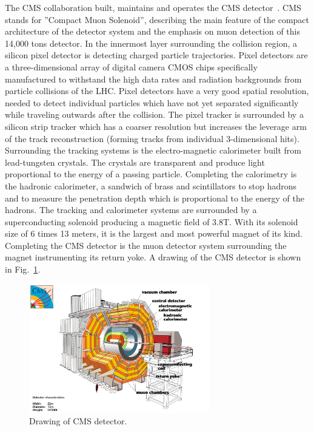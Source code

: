 \documentclass{wscpaperproc}
\theoremstyle{wsc}
\begin{document}
The CMS collaboration built, maintains and operates the CMS detector~. CMS stands for ''Compact Muon Solenoid'', describing the main feature of the compact architecture of the detector system and the emphasis on muon detection of this 14,000 tons detector. In the innermost layer surrounding the collision region, a silicon pixel detector is detecting charged particle trajectories. Pixel detectors are a three-dimensional array of digital camera CMOS chips specifically manufactured to withstand the high data rates and radiation backgrounds from particle collisions of the LHC. Pixel detectors have a very good spatial resolution, needed to detect individual particles which have not yet separated significantly while traveling outwards after the collision. The pixel tracker is surrounded by a silicon strip tracker which has a coarser resolution but increases the leverage arm of the track reconstruction (forming tracks from individual 3-dimensional hits). Surrounding the tracking systems is the electro-magnetic calorimeter built from lead-tungsten crystals. The crystals are transparent and produce light proportional to the energy of a passing particle. Completing the calorimetry is the hadronic calorimeter, a sandwich of brass and scintillators to stop hadrons and to measure the penetration depth which is proportional to the energy of the hadrons. The tracking and calorimeter systems are surrounded by a superconducting solenoid producing a magnetic field of 3.8T. With its solenoid size of 6 times 13 meters, it is the largest and most powerful magnet of its kind. Completing the CMS detector is the muon detector system surrounding the magnet instrumenting its return yoke. A drawing of the CMS detector is shown in Fig.~\ref{fig:cms}.

\begin{figure}[htb]
{
   \centering
   \includegraphics[width=0.70\textwidth]{cms}
   \caption{Drawing of CMS detector.
   \label{fig:cms}}
}
\end{figure}
\end{document}
